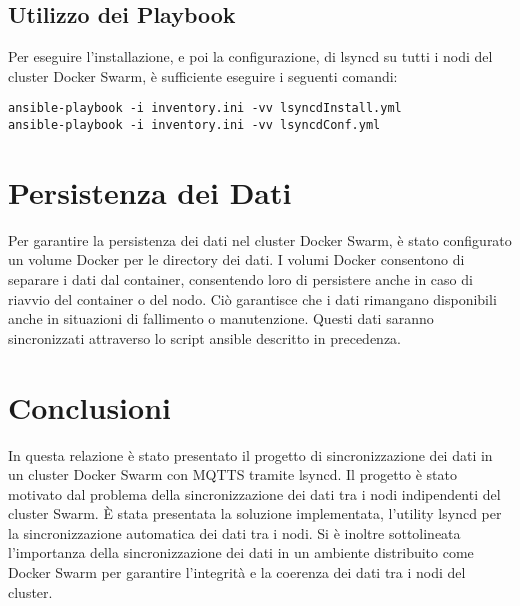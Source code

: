 \documentclass[a4paper, 12pt]{article}
\begin{document}
\subsection{Utilizzo dei Playbook}
Per eseguire l'installazione, e poi la configurazione, di lsyncd su tutti i nodi del 
cluster Docker Swarm, è sufficiente eseguire i seguenti comandi:
\begin{lstlisting}
ansible-playbook -i inventory.ini -vv lsyncdInstall.yml
ansible-playbook -i inventory.ini -vv lsyncdConf.yml
\end{lstlisting}

\section{Persistenza dei Dati}
Per garantire la persistenza dei dati nel cluster Docker Swarm, è stato 
configurato un volume Docker per le directory dei dati. I volumi Docker 
consentono di separare i dati dal container, consentendo loro di persistere 
anche in caso di riavvio del container o del nodo. Ciò garantisce che i dati 
rimangano disponibili anche in situazioni di fallimento o manutenzione.
Questi dati saranno sincronizzati attraverso lo script ansible descritto in precedenza.

\section{Conclusioni}
In questa relazione è stato presentato il progetto di sincronizzazione 
dei dati in un cluster Docker Swarm con MQTTS tramite lsyncd. Il progetto è stato motivato 
dal problema della sincronizzazione dei dati tra i nodi indipendenti del cluster Swarm. 
È stata presentata la soluzione implementata, l'utility lsyncd per la sincronizzazione automatica 
dei dati tra i nodi. Si è inoltre sottolineata l'importanza della sincronizzazione 
dei dati in un ambiente distribuito come Docker Swarm per garantire l'integrità e 
la coerenza dei dati tra i nodi del cluster.
\end{document}

